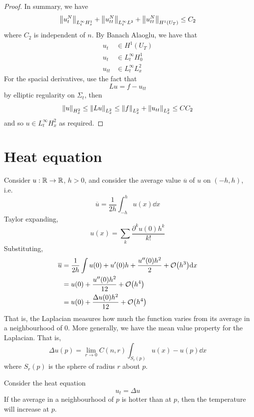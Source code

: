 \documentclass{article}
\begin{document}
\begin{proof}
    In summary, we have
    \begin{align*}
        \norm{u^N_t}_{L^\infty_tH^1_x} + \norm{u^N_{tt}}_{L^\infty_tL^2} + \norm{u^N_{tt}}_{H^1(U_T)} \le C_2
    \end{align*}
    where \(C_2\) is independent of \(n\). By Banach Alaoglu, we have that
    \begin{align*}
        u_t &\in H^1(U_T) \\
        u_t &\in L^\infty_tH^1_0 \\
        u_{tt} &\in L^\infty_tL^2_x
    \end{align*}
    For the spacial derivatives, use the fact that
    \[Lu = f - u_{tt}\]
    by elliptic regularity on \(\Sigma_t\), then
    \[\norm{u}_{H^2_x} \le \norm{Lu}_{L^2_x} \le \norm{f}_{L^2_x} + \norm{u_{tt}}_{L^2_x} \le CC_2\]
    and so \(u \in L^\infty_tH^2_x\) as required.
\end{proof}

\lec

\section{Heat equation}

Consider \(u : \mathbb{R} \to \mathbb{R}\), \(h > 0\), and consider the average value \(\overline u\) of \(u\) on \((-h, h)\), i.e.
\[\overline u = \frac{1}{2h}\int_{-h}^hu(x)\dd x\]
Taylor expanding,
\[u(x) = \sum_k \frac{\partial^ku(0)h^k}{k!}\]
Substituting,
\begin{align*}
    \overline u &= \frac{1}{2h}\int u(0) + u'(0)h + \frac{u''(0)h^2}{2} + \order{h^3}\dd x \\
    &= u(0) + \frac{u''(0)h^2}{12} + \order{h^4} \\
    &= u(0) + \frac{\Delta u(0) h^2}{12} + \order{h^4}
\end{align*}
That is, the Laplacian measures how much the function varies from its average in a neighbourhood of \(0\). More generally, we have the mean value property for the Laplacian. That is,
\[\Delta u(p) = \lim_{r \to 0}C(n, r)\int_{S_r(p)}u(x) - u(p)\dd x\]
where \(S_r(p)\) is the sphere of radius \(r\) about \(p\).

Consider the heat equation
\[u_t = \Delta u\]
If the average in a neighbourhood of \(p\) is hotter than at \(p\), then the temperature will increase at \(p\).
\end{document}

